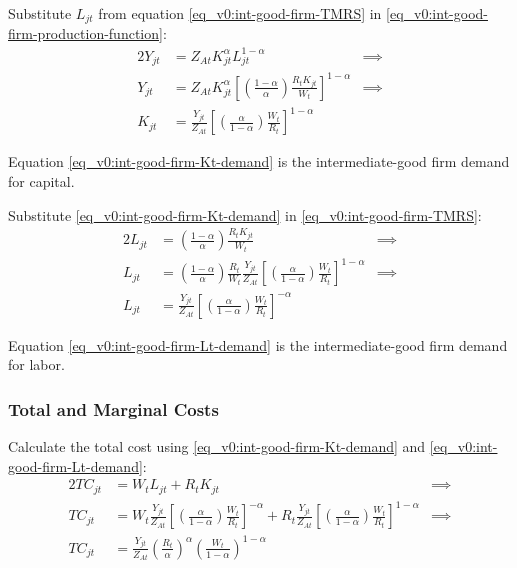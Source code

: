 \documentclass[../thesis.tex]{subfiles}
\begin{document}
	Substitute $L_{jt}$ from equation \ref{eq_v0:int-good-firm-TMRS} in \ref{eq_v0:int-good-firm-production-function}:
	\begin{alignat}{2}
		Y_{jt} & = Z_{At} K_{jt}^\alpha L_{jt}^{1-\alpha} &\implies \nonumber \\
		Y_{jt} & = Z_{At} K_{jt}^\alpha \left[ \left( \frac{1-\alpha}{\alpha} \right) \frac{R_t K_{jt}}{W_t} \right]^{1-\alpha} &\implies \nonumber \\
		K_{jt} & = \frac{Y_{jt}}{Z_{At}} \left[ \left( \frac{\alpha}{1-\alpha} \right) \frac{W_t}{R_t}\right]^{1-\alpha} \label{eq_v0:int-good-firm-Kt-demand}
	\end{alignat}
	
	Equation \ref{eq_v0:int-good-firm-Kt-demand} is the intermediate-good firm demand for capital. 
	
	Substitute \ref{eq_v0:int-good-firm-Kt-demand} in \ref{eq_v0:int-good-firm-TMRS}:
	\begin{alignat}{2}
		L_{jt} & = \left( \frac{1-\alpha}{\alpha} \right) \frac{R_t K_{jt}}{W_t} &\implies \nonumber \\
		L_{jt} & = \left( \frac{1-\alpha}{\alpha} \right) \frac{R_t}{W_t} \frac{Y_{jt}}{Z_{At}} \left[ \left( \frac{\alpha}{1-\alpha} \right) \frac{W_t}{R_t}\right]^{1-\alpha} &\implies \nonumber \\
		L_{jt} & = \frac{Y_{jt}}{Z_{At}} \left[ \left( \frac{\alpha}{1-\alpha} \right) \frac{W_t}{R_t}\right]^{-\alpha} \label{eq_v0:int-good-firm-Lt-demand}
	\end{alignat}
	
	Equation \ref{eq_v0:int-good-firm-Lt-demand} is the intermediate-good firm demand for labor.
	
	\subsubsection*{Total and Marginal Costs}
	
	Calculate the total cost using \ref{eq_v0:int-good-firm-Kt-demand} and \ref{eq_v0:int-good-firm-Lt-demand}:
	\begin{alignat}{2}
		TC_{jt} & = W_t L_{jt} + R_t K_{jt} &\implies \nonumber \\
		TC_{jt} & = W_t \frac{Y_{jt}}{Z_{At}} \left[ \left( \frac{\alpha}{1-\alpha} \right) \frac{W_t}{R_t} \right]^{-\alpha} + R_t \frac{Y_{jt}}{Z_{At}} \left[ \left( \frac{\alpha}{1-\alpha} \right) \frac{W_t}{R_t} \right]^{1-\alpha} &\implies \nonumber \\
		TC_{jt} & = \frac{Y_{jt}}{Z_{At}} \left( \frac{R_t}{\alpha} \right)^{\alpha} \left( \frac{W_t}{1-\alpha} \right)^{1-\alpha} \label{eq_v0:int-good-firm-TC}
	\end{alignat}
	
\end{document}
